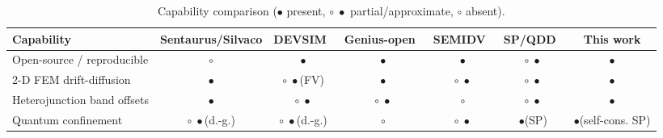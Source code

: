 \documentclass[conference]{IEEEtran}
\newcommand{\yes}{$\bullet$}
\newcommand{\part}{$\circ\!\!\!\!\;\bullet$}
\newcommand{\no}{$\circ$}
\begin{document}
\begin{table}[t]
\caption{Capability comparison (\yes{} present, \part{} partial/approximate,
\no{} absent).}
\label{tab:gap}
\centering
\renewcommand{\arraystretch}{1.25}
\begin{tabular}{@{}lcccccc@{}}
\toprule
Capability & Sentaurus/Silvaco & DEVSIM~\cite{devsim} & Genius-open~\cite{genius}
& SEMIDV~\cite{semidv} & SP/QDD~\cite{qdd} & \textbf{This work} \\
\midrule
Open-source / reproducible          & \no  & \yes  & \yes  & \yes  & \part & \yes \\
2-D FEM drift-diffusion             & \yes & \part{}(FV) & \yes & \part & \part & \yes \\
Heterojunction band offsets         & \yes & \part & \part & \no  & \part & \yes \\
Quantum confinement                 & \part{}(d.-g.) & \part{}(d.-g.) & \no & \part & \yes{}(SP) & \yes{}(self-cons. SP) \\

\end{tabular}
\end{table}
\end{document}

